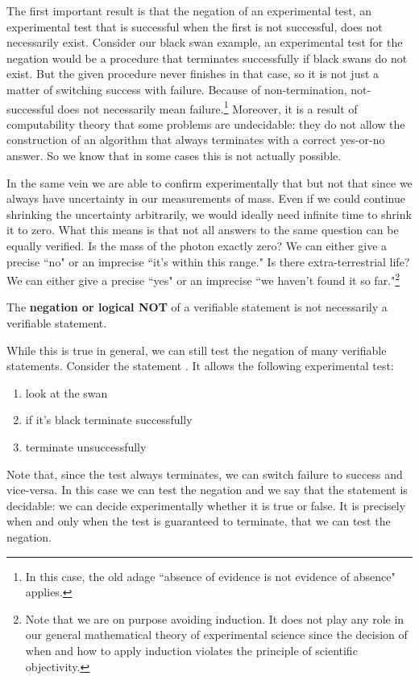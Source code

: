 \documentclass[11pt,letterpaper,fleqn]{memoir} %
\begin{document}
The first important result is that the negation of an experimental test, an experimental test that is successful when the first is not successful, does not necessarily exist. Consider our black swan example, an experimental test for the negation would be a procedure that terminates successfully if black swans do not exist. But the given procedure never finishes in that case, so it is not just a matter of switching success with failure. Because of non-termination, not-successful does not necessarily mean failure.\footnote{In this case, the old adage ``absence of evidence is not evidence of absence" applies.} Moreover, it is a result of computability theory that some problems are undecidable: they do not allow the construction of an algorithm that always terminates with a correct yes-or-no answer. So we know that in some cases this is not actually possible.

In the same vein we are able to confirm experimentally that  but not that  since we always have uncertainty in our measurements of mass. Even if we could continue shrinking the uncertainty arbitrarily, we would ideally need infinite time to shrink it to zero. What this means is that not all answers to the same question can be equally verified. Is the mass of the photon exactly zero? We can either give a precise ``no" or an imprecise ``it's within this range." Is there extra-terrestrial life? We can either give a precise ``yes" or an imprecise ``we haven't found it so far."\footnote{Note that we are on purpose avoiding induction. It does not play any role in our general mathematical theory of experimental science since the decision of when and how to apply induction violates the principle of scientific objectivity.}

\begin{mathSection}
	\begin{remark}
	The \textbf{negation or logical NOT} of a verifiable statement is not necessarily a verifiable statement.
	\end{remark}
\end{mathSection}

While this is true in general, we can still test the negation of many verifiable statements. Consider the statement . It allows the following experimental test:
\begin{enumerate}
	\item look at the swan
	\item if it's black terminate successfully
	\item terminate unsuccessfully
\end{enumerate}
Note that, since the test always terminates, we can switch failure to success and vice-versa. In this case we can test the negation and we say that the statement is decidable: we can decide experimentally whether it is true or false. It is precisely when and only when the test is guaranteed to terminate, that we can test the negation.
\end{document}
